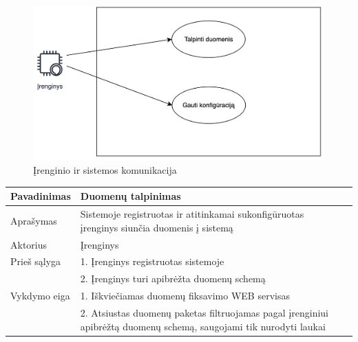 \documentclass{VUMIFInfBakalaurinis}
\begin{document}
\begin{figure}[H]
  \centering
  \includegraphics[scale=0.6]{img/UC-device}
  \caption{Įrenginio ir sistemos komunikacija}
  \label{img:mlp}
\end{figure}

\begin{tabular}{  l  p{10cm}  p{15cm} }

\toprule
\textbf{Pavadinimas}
& \textbf{Duomenų talpinimas} \\
\midrule

Aprašymas
& Sistemoje registruotas ir atitinkamai sukonfigūruotas įrenginys siunčia duomenis į sistemą \\

\hline
Aktorius
& Įrenginys \\

\hline
Prieš sąlyga
& 1. Įrenginys registruotas sistemoje \\
& 2. Įrenginys turi apibrėžta duomenų schemą \\

\hline
Vykdymo eiga
& 1. Iškviečiamas duomenų fiksavimo WEB servisas \\
& 2. Atsiustas duomenų paketas filtruojamas pagal įrenginiui apibrėžtą duomenų schemą, saugojami tik nurodyti laukai \\

\bottomrule
\end{tabular}

\hfill \break
\end{document}
